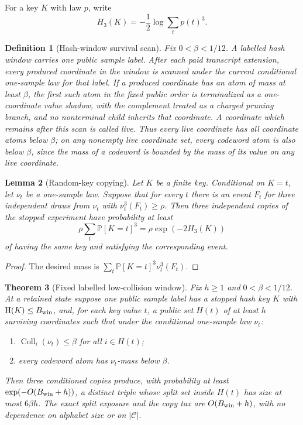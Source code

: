 \documentclass[11pt]{article}
\newtheorem{theorem}{Theorem}[section]
\newtheorem{lemma}[theorem]{Lemma}
\newtheorem{definition}[theorem]{Definition}
\theoremstyle{remark}
\newcommand{\C}{\mathcal C}
\newcommand{\Prob}{\mathbb P}
\newcommand{\HH}{\mathrm H}
\newcommand{\Coll}{\operatorname{Coll}}
\begin{document}
For a key $K$ with law $p$, write
\[
        H_3(K)=-\frac{1}{2}\log\sum_t p(t)^3.
\]

\begin{definition}[Hash-window survival scan]\label{def:hash-survival}
Fix $0<\beta<1/12$.  A labelled hash window carries one public sample label.  After each paid transcript extension, every produced coordinate in the window is scanned under the current conditional one-sample law for that label.  If a produced coordinate has an atom of mass at least $\beta$, the first such atom in the fixed public order is terminalized as a one-coordinate value shadow, with the complement treated as a charged pruning branch, and no nonterminal child inherits that coordinate.  A coordinate which remains after this scan is called live.  Thus every live coordinate has all coordinate atoms below $\beta$; on any nonempty live coordinate set, every codeword atom is also below $\beta$, since the mass of a codeword is bounded by the mass of its value on any live coordinate.
\end{definition}

\begin{lemma}[Random-key copying]\label{lem:random-copy}
Let $K$ be a finite key.  Conditional on $K=t$, let $\nu_t$ be a one-sample law.  Suppose that for every $t$ there is an event $F_t$ for three independent draws from $\nu_t$ with $\nu_t^3(F_t)\ge\rho$.  Then three independent copies of the stopped experiment have probability at least
\[
        \rho\sum_t\Prob[K=t]^3=\rho\exp(-2H_3(K))
\]
of having the same key and satisfying the corresponding event.
\end{lemma}

\begin{proof}
The desired mass is $\sum_t\Prob[K=t]^3\nu_t^3(F_t)$.
\end{proof}

\begin{theorem}[Fixed labelled low-collision window]\label{thm:fixed-window}
Fix $h\ge1$ and $0<\beta<1/12$.  At a retained state suppose one public sample label has a stopped hash key $K$ with $\HH(K)\le B_{\rm win}$, and, for each key value $t$, a public set $H(t)$ of at least $h$ surviving coordinates such that under the conditional one-sample law $\nu_t$:
\begin{enumerate}[label=\textup{(\roman*)}]
\item $\Coll_i(\nu_t)\le\beta$ for all $i\in H(t)$;
\item every codeword atom has $\nu_t$-mass below $\beta$.
\end{enumerate}
Then three conditioned copies produce, with probability at least $\exp(-O(B_{\rm win}+h))$, a distinct triple whose split set inside $H(t)$ has size at most $6\beta h$.  The exact split exposure and the copy tax are $O(B_{\rm win}+h)$, with no dependence on alphabet size or on $|\C|$.
\end{theorem}
\end{document}

